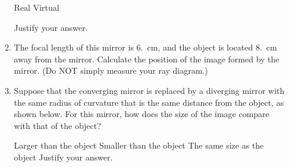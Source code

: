 \documentclass{../../../oss-apphys}
\begin{document}
\begin{enumerate}[leftmargin=15pt]
\begin{enumerate}
    \vspace{.2in}
    \underline{\hspace{.4in}} Real\hspace{.3in}
    \underline{\hspace{.4in}} Virtual

    \vspace{.1in}Justify your answer.
  \item The focal length of this mirror is \SI{6.}{\centi\metre}, and the
    object is located \SI{8.}{\centi\metre} away from the mirror. Calculate the
    position of the image formed by the mirror. (Do NOT simply measure your ray
    diagram.)
  \item Suppose that the converging mirror is replaced by a diverging mirror
    with the same radius of curvature that is the same distance from the
    object, as shown below.
    For this mirror, how does the size of the image compare with that of the
    object?

    \vspace{.2in}
    \underline{\hspace{.4in}} Larger than the object\hspace{.3in}
    \underline{\hspace{.4in}} Smaller than the object\hspace{.3in}
    \underline{\hspace{.4in}} The same size as the object
    Justify your answer.
  \end{enumerate}
  \newpage


\end{enumerate}
\end{document}
